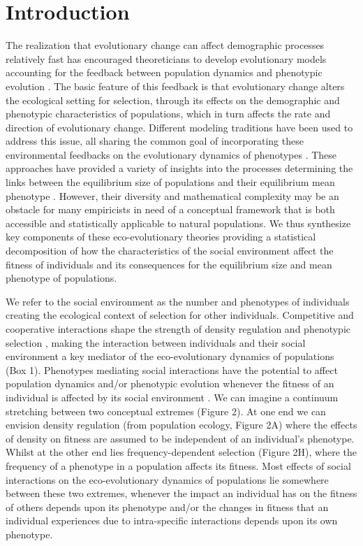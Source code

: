 \documentclass{article}
\begin{document}
\newpage
\section{Introduction}
 The realization that evolutionary change can affect demographic processes relatively fast has encouraged theoreticians to develop evolutionary models accounting for the feedback between population dynamics and phenotypic evolution \cite[reviewed by][]{Pelletier2009, Hendry2018, Govaert2019}. The basic feature of this feedback is that evolutionary change alters the ecological setting for selection, through its effects on the demographic and phenotypic characteristics of populations, which in turn affects the rate and direction of evolutionary change. Different modeling traditions have been used to address this issue, all sharing the common goal of incorporating these environmental feedbacks on the evolutionary dynamics of phenotypes \citep{Heino1998, Lion2018}. These approaches have provided a variety of insights into the processes determining the links between the equilibrium size of populations and their equilibrium mean phenotype \citep{MacArthur1962, Boyce1984, Charlesworth1994, Abrams1993, Mylius1995, Lande2009a, Engen2020}. However, their diversity and mathematical complexity may be an obstacle for many empiricists in need of a conceptual framework that is both accessible and statistically applicable to natural populations. We thus synthesize key components of these eco-evolutionary theories providing a statistical decomposition of how the characteristics of the social environment affect the fitness of individuals and its consequences for the equilibrium size and mean phenotype of populations. 
 
 We refer to the social environment as the number and phenotypes of individuals creating the ecological context of selection for other individuals. Competitive and cooperative interactions shape the strength of density regulation and phenotypic selection \citep{Lack1954, Haldane1956, West-Eberhard1979, frank1998foundations}, making the interaction between individuals and their social environment a key mediator of the eco-evolutionary dynamics of populations (Box 1). Phenotypes mediating social interactions have the potential to affect population dynamics and/or phenotypic evolution whenever the fitness of an individual is affected by its social environment \citep{Wolf1999SocialSelection, Travis2013}. We can imagine a continuum stretching between two conceptual extremes (Figure 2). At one end we can envision density regulation (from population ecology, Figure 2A) where the effects of density on fitness are assumed to be independent of an individual's phenotype. Whilst at the other end lies frequency-dependent selection (Figure 2H), where the frequency of a phenotype in a population affects its fitness. Most effects of social interactions on the eco-evolutionary dynamics of populations lie somewhere between these two extremes, whenever the impact an individual has on the fitness of others depends upon its phenotype and/or the changes in fitness that an individual experiences due to intra-specific interactions depends upon its own phenotype. 
 
\end{document}
